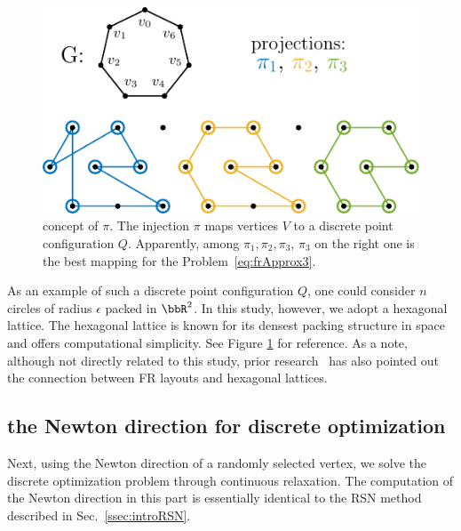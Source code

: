 \documentclass[dvipdfmx,lettersize,journal]{IEEEtran}
\begin{document}
\begin{figure}[t]
  \centering
  \includegraphics[width=\columnwidth]{pi/pi.pdf}
  \caption{
    concept of $\pi$.
    The injection $\pi$ maps vertices $V$ to a discrete point configuration $Q$.
    Apparently, among $\pi_1, \pi_2, \pi_3$, $\pi_3$ on the right one is the best mapping for the Problem~\eqref{eq:frApprox3}.
  }
  \label{fig:pi}
\end{figure}

As an example of such a discrete point configuration $Q$, one could consider $n$ circles of radius $\epsilon$ packed in $\bbR^2$.
In this study, however, we adopt a hexagonal lattice.
The hexagonal lattice is known for its densest packing structure in space and offers computational simplicity.
See Figure \ref{fig:pi} for reference.
As a note, although not directly related to this study, prior research~\cite{s22145179} has also pointed out the connection between FR layouts and hexagonal lattices.

\subsection{the Newton direction for discrete optimization}\label{ssec:newtonDirection}

Next, using the Newton direction of a randomly selected vertex, we solve the discrete optimization problem through continuous relaxation. The computation of the Newton direction in this part is essentially identical to the RSN method described in Sec.~\ref{ssec:introRSN}.
\end{document}
